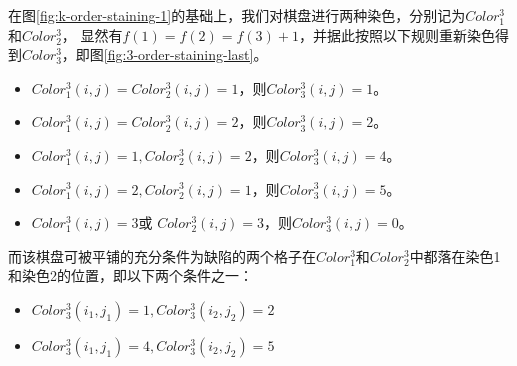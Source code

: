 在图\ref*{fig:k-order-staining-1}的基础上，我们对棋盘进行两种染色，分别记为$Color^3_1$和$Color^3_2$，
显然有$f(1) = f(2) = f(3) + 1$，并据此按照以下规则重新染色得到$Color^3_3$，即图\ref*{fig:3-order-staining-last}。

\begin{itemize}
	\item $Color^3_1(i, j) = Color^3_2(i, j) = 1$，则$Color^3_3(i, j) = 1$。
	\item $Color^3_1(i, j) = Color^3_2(i, j) = 2$，则$Color^3_3(i, j) = 2$。
	\item $Color^3_1(i, j) = 1, Color^3_2(i, j) = 2$，则$Color^3_3(i, j) = 4$。
	\item $Color^3_1(i, j) = 2, Color^3_2(i, j) = 1$，则$Color^3_3(i, j) = 5$。
	\item $Color^3_1(i, j) = 3$或 $Color^3_2(i, j) = 3$，则$Color^3_3(i, j) = 0$。
\end{itemize}

而该棋盘可被平铺的充分条件为缺陷的两个格子在$Color^3_1$和$Color^3_2$中都落在染色1和染色2的位置，即以下两个条件之一：

\begin{itemize}
	\item $Color^3_3(i_1, j_1) = 1, Color^3_3(i_2, j_2) = 2$
	\item $Color^3_3(i_1, j_1) = 4, Color^3_3(i_2, j_2) = 5$
\end{itemize}

